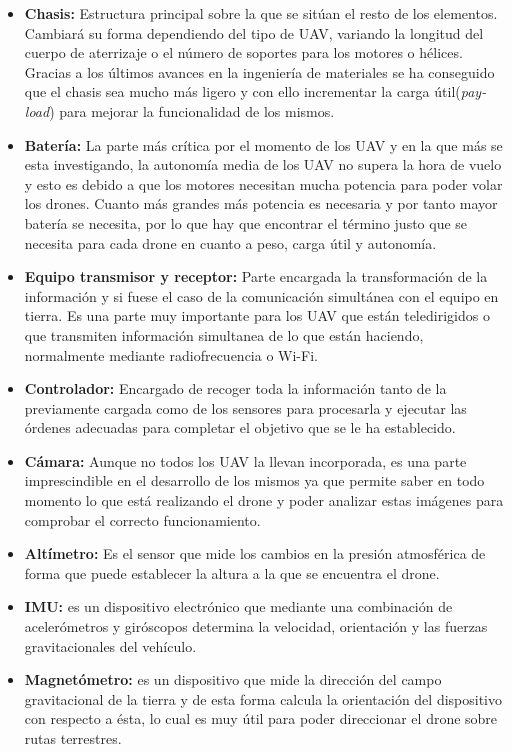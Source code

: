 \begin{itemize}
		\item \textbf{Chasis:} Estructura principal  sobre  la  que  se sitúan el resto de los elementos. Cambiará su forma dependiendo del tipo de UAV, variando la longitud del cuerpo de aterrizaje o el número de soportes para los motores o hélices. Gracias a los últimos avances en la ingeniería de materiales se ha conseguido que el chasis sea mucho más ligero y con ello incrementar la carga útil(\textit{pay-load}) para mejorar la funcionalidad de los mismos.
		\item \textbf{Batería:} La parte más crítica por el momento de los UAV y en la que más se esta investigando, la autonomía media de los UAV no supera la hora de vuelo y esto es debido a que los motores necesitan mucha potencia para poder volar los drones. Cuanto más grandes más potencia es necesaria y por tanto mayor batería se necesita, por lo que hay que encontrar el término justo que se necesita para cada drone en cuanto a peso, carga útil y autonomía. 
		\item \textbf{Equipo transmisor y receptor:} Parte encargada la transformación de la información y si fuese el caso de la comunicación simultánea con el equipo en tierra. Es una parte muy importante para los UAV que están teledirigidos o que transmiten información simultanea de lo que están haciendo, normalmente mediante radiofrecuencia o Wi-Fi.
		\item \textbf{Controlador:} Encargado de recoger toda la información tanto de la previamente cargada como de los sensores para procesarla y ejecutar las órdenes adecuadas para completar el objetivo que se le ha establecido. 
		\item \textbf{Cámara:} Aunque no todos los UAV la llevan incorporada, es una parte imprescindible en el desarrollo de los mismos ya que permite saber en todo momento lo que está realizando el drone y poder analizar estas imágenes para comprobar el correcto funcionamiento.
		\item \textbf{Altímetro:} Es el sensor que mide los cambios en la presión atmosférica de forma que puede establecer la altura a la que se encuentra el drone.
		\item \textbf{IMU:} es un dispositivo electrónico que mediante una combinación de acelerómetros y giróscopos determina la velocidad, orientación y las fuerzas gravitacionales del vehículo.
		\item \textbf{Magnetómetro:} es un dispositivo que mide la dirección del campo gravitacional de la tierra y de esta forma calcula la orientación del dispositivo con respecto a ésta, lo cual es muy útil para poder direccionar el drone sobre rutas terrestres.
	\end{itemize}

